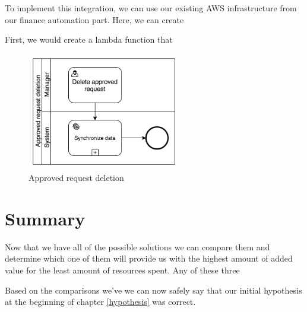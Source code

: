 \documentclass[12pt,oneside]{fithesis2}
\begin{document}
To implement this integration, we can use our existing AWS infrastructure from our finance automation part. Here, we can create 

First, we would create a lambda function that 

\begin{figure}[H]
    \centering
    \includegraphics[width=0.6\textwidth]{delete_approved.png}
    \caption{Approved request deletion}
    \label{fig:delete_approved}
\end{figure}
\section{Summary}
Now that we have all of the possible solutions we can compare them and determine which one of them will provide us with the highest amount of added value for the least amount of resources spent. Any of these three 

Based on the comparisons we've we can now safely say that our initial hypothesis at the beginning of chapter \ref{hypothesis} was correct.
\end{document}
